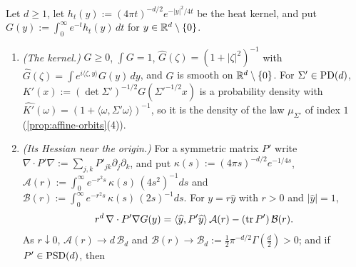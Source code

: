 \begin{lemma}
\label{lem:matern-kernel-hessian}
\leanok
Let $d \ge 1$, let $h_t(y) := (4\pi t)^{-d/2}e^{-|y|^2/4t}$ be the heat kernel, and put
$G(y) := \int_0^\infty e^{-t}h_t(y)\,dt$ for $y \in \mathbb{R}^d \setminus \{0\}$.
\begin{enumerate}
\item \emph{(The kernel.)} $G \ge 0$, $\int G = 1$, $\widehat G(\zeta) = (1+|\zeta|^2)^{-1}$ with
$\widehat G(\zeta) = \int e^{i\langle\zeta,y\rangle}G(y)\,dy$, and $G$ is smooth on $\mathbb{R}^d \setminus \{0\}$.
For $\Sigma' \in \mathrm{PD}(d)$, $K'(x) := (\det\Sigma')^{-1/2}G(\Sigma'^{-1/2}x)$ is a probability density
with $\widehat{K'}(\omega) = (1 + \langle\omega,\Sigma'\omega\rangle)^{-1}$, so it is the density of the
\Matern{} law $\mu_{\Sigma'}$ of index $1$ (\ref{prop:affine-orbits}(4)).
\item \emph{(Its Hessian near the origin.)} For a symmetric matrix $P'$ write
$\nabla\cdot P'\nabla := \sum_{j,k}P'_{jk}\partial_j\partial_k$, and put $\kappa(s) := (4\pi s)^{-d/2}e^{-1/4s}$,
$\mathcal{A}(r) := \int_0^\infty e^{-r^2s}\,\kappa(s)\,(4s^2)^{-1}ds$ and
$\mathcal{B}(r) := \int_0^\infty e^{-r^2s}\,\kappa(s)\,(2s)^{-1}ds$. For $y = r\widehat y$ with $r > 0$ and
$|\widehat y| = 1$,
\[
  r^d\,\nabla\cdot P'\nabla G(y) = \langle\widehat y, P'\widehat y\rangle\,\mathcal{A}(r) - (\operatorname{tr} P')\,\mathcal{B}(r) .
\]
As $r \downarrow 0$, $\mathcal{A}(r) \to d\,\mathcal{B}_d$ and $\mathcal{B}(r) \to \mathcal{B}_d :=
\tfrac12\pi^{-d/2}\Gamma(\tfrac d2) > 0$; and if $P' \in \mathrm{PSD}(d)$, then

\end{enumerate}
\end{lemma}
